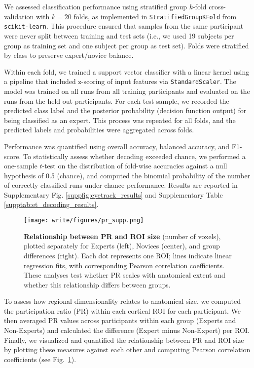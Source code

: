 We assessed classification performance using stratified group $k$-fold cross-validation with $k = 20$ folds, as implemented in \texttt{StratifiedGroupKFold} from \texttt{scikit-learn}. This procedure ensured that samples from the same participant were never split between training and test sets (i.e., we used 19 subjects per group as training set and one subject per group as test set). Folds were stratified by class to preserve expert/novice balance.

Within each fold, we trained a support vector classifier with a linear kernel using a pipeline that included z-scoring of input features via \texttt{StandardScaler}. The model was trained on all runs from all training participants and evaluated on the runs from the held-out participants. For each test sample, we recorded the predicted class label and the posterior probability (decision function output) for being classified as an expert. This process was repeated for all folds, and the predicted labels and probabilities were aggregated across folds.

Performance was quantified using overall accuracy, balanced accuracy, and F1-score. To statistically assess whether decoding exceeded chance, we performed a one-sample $t$-test on the distribution of fold-wise accuracies against a null hypothesis of 0.5 (chance), and computed the binomial probability of the number of correctly classified runs under chance performance. Results are reported in Supplementary Fig. \ref{suppfig:eyetrack_results} and Supplementary Table \ref{supptab:et_decoding_results}.

\begin{figure}[!ht]
    \centering
    \texttt{[image: write/figures/pr\_supp.png]}
    \caption{\textbf{Relationship between PR and ROI size} (number of voxels), plotted separately for Experts (left), Novices (center), and group differences (right). Each dot represents one ROI; lines indicate linear regression fits, with corresponding Pearson correlation coefficients. These analyses test whether PR scales with anatomical extent and whether this relationship differs between groups.
  }
    \label{suppfig:pr_suppl}
\end{figure}


To assess how regional dimensionality relates to anatomical size, we computed the participation ratio (PR) within each cortical ROI for each participant. We then averaged PR values across participants within each group (Experts and Non-Experts) and calculated the difference (Expert minus Non-Expert) per ROI. Finally, we visualized and quantified the relationship between PR and ROI size by plotting these measures against each other and computing Pearson correlation coefficients (see Fig.~\ref{suppfig:pr_suppl}).

